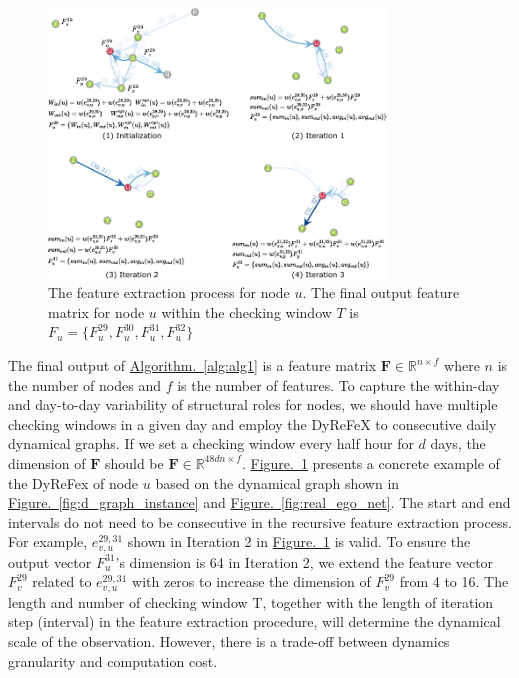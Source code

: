 \documentclass[a4paper,fleqn]{cas-sc}
\begin{document}
\begin{figure}[!htb]
  \centering
  \includegraphics[width=0.8\textwidth]{figs/iteration_ins.pdf}
  \caption{The feature extraction process for node $u$. The final output feature matrix for node $u$ within the checking window $T$ is $F_{u} = \{F_{u}^{29}, F_{u}^{30}, F_{u}^{31}, F_{u}^{32}\}$}\label{fig:iteration_ins}
\end{figure}

The final output of \hyperref[alg:alg1]{Algorithm.~\ref{alg:alg1}} is a feature matrix $\textbf{F}\in \mathbb{R}^{n\times f}$ where $n$ is the number of nodes and $f$ is the number of features. To capture the within-day and day-to-day variability of structural roles for nodes, we should have multiple checking windows in a given day and employ the DyReFeX to consecutive daily dynamical graphs. If we set a checking window every half hour for $d$ days, the dimension of $\textbf{F}$ should be $\textbf{F}\in \mathbb{R}^{48dn\times f}$. \hyperref[fig:iteration_ins]{Figure.~\ref{fig:iteration_ins}} presents a concrete example of the DyReFex of node $u$ based on the dynamical graph shown in \hyperref[fig:d_graph_instance]{Figure.~\ref{fig:d_graph_instance}} and \hyperref[fig:real_ego_net]{Figure.~\ref{fig:real_ego_net}}. The start and end intervals do not need to be consecutive in the recursive feature extraction process. For example, $e_{v,u}^{29,31}$ shown in Iteration 2 in \hyperref[fig:iteration_ins]{Figure.~\ref{fig:iteration_ins}} is valid. To ensure the output vector $F_{u}^{31}$'s dimension is 64 in Iteration 2, we extend the feature vector $F_{v}^{29}$ related to $e_{v,u}^{29,31}$ with zeros to increase the dimension of $F_{v}^{29}$ from 4 to 16. The length and number of checking window T, together with the length of iteration step (interval) in the feature extraction procedure, will determine the dynamical scale of the observation. However, there is a trade-off between dynamics granularity and computation cost.
\end{document}
